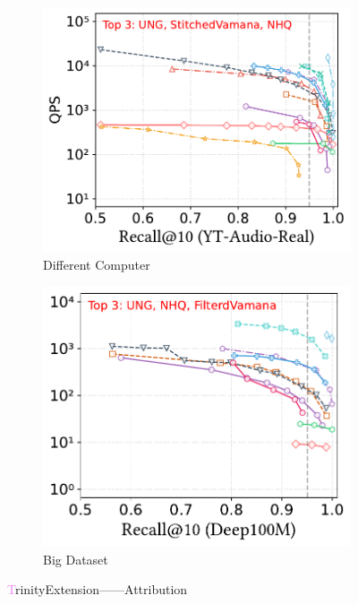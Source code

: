 \documentclass[sigconf, nonacm]{acmart}
\begin{document}
\begin{figure}[t]
		\begin{subfigure}[t]{0.507\columnwidth}
			\centering
			\includegraphics[width=\linewidth]{figures/exp/attribute_85.pdf}
			\caption{\footnotesize Different Computer}
			\label{fig:Different Computer}
		\end{subfigure}
		\hfill
		\begin{subfigure}[t]{0.48\columnwidth}
			\centering
			\includegraphics[width=\linewidth]{figures/exp/attribute_100M.pdf}
			\caption{\footnotesize Big Dataset}
			\label{fig:Big Dataset}
		\end{subfigure}

		
		\caption{\textcolor{violet}TrinityExtension——Attribution}
		\label{fig:TrinityExtension——Attribution}
	\end{figure}
	
\end{document}
